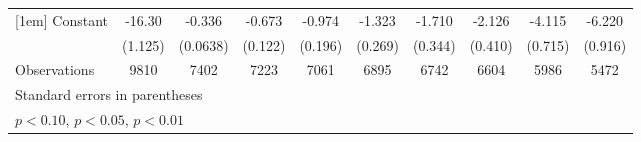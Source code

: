 \begin{table}[htbp]
\begin{tabular}{l*{9}{c}}
[1em]
Constant            &      -16.30\sym{***}&      -0.336\sym{***}&      -0.673\sym{***}&      -0.974\sym{***}&      -1.323\sym{***}&      -1.710\sym{***}&      -2.126\sym{***}&      -4.115\sym{***}&      -6.220\sym{***}\\
                    &     (1.125)         &    (0.0638)         &     (0.122)         &     (0.196)         &     (0.269)         &     (0.344)         &     (0.410)         &     (0.715)         &     (0.916)         \\
\hline
Observations        &        9810         &        7402         &        7223         &        7061         &        6895         &        6742         &        6604         &        5986         &        5472         \\
\hline\hline
\multicolumn{10}{l}{\footnotesize Standard errors in parentheses}\\
\multicolumn{10}{l}{\footnotesize \sym{*} \(p<0.10\), \sym{**} \(p<0.05\), \sym{***} \(p<0.01\)}\\
\end{tabular}
\end{table}
